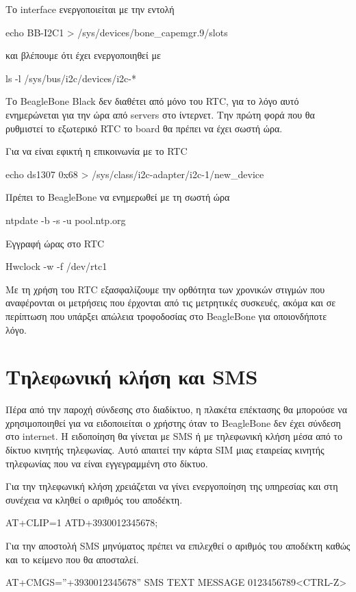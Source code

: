 \documentclass[12pt, a4paper, oneside]{report}
\begin{document}
Το interface ενεργοποιείται με την εντολή
\begin{code}
echo BB-I2C1 > /sys/devices/bone_capemgr.9/slots
\end{code}
και βλέπουμε ότι έχει ενεργοποιηθεί με
\begin{code}
ls -l /sys/bus/i2c/devices/i2c-*
\end{code}

Το BeagleBone Black δεν διαθέτει από μόνο του RTC, για το λόγο αυτό ενημερώνεται για την ώρα από servers στο ίντερνετ. Την πρώτη φορά που θα ρυθμιστεί το εξωτερικό RTC το board θα πρέπει να έχει σωστή ώρα.

Για να είναι εφικτή η επικοινωνία με το RTC
\begin{code}
echo ds1307 0x68 > /sys/class/i2c-adapter/i2c-1/new_device
\end{code}

Πρέπει το BeagleBone να ενημερωθεί με τη σωστή ώρα
\begin{code}
ntpdate -b -s -u pool.ntp.org
\end{code}

Εγγραφή ώρας στο RTC
\begin{code}
Hwclock -w -f /dev/rtc1
\end{code}

Με τη χρήση του RTC εξασφαλίζουμε την ορθότητα των χρονικών στιγμών που αναφέρονται οι μετρήσεις που έρχονται από τις μετρητικές συσκευές, ακόμα και σε περίπτωση που υπάρξει απώλεια τροφοδοσίας στο BeagleBone για οποιονδήποτε λόγο.

\section{Τηλεφωνική κλήση και SMS}

Πέρα από την παροχή σύνδεσης στο διαδίκτυο, η πλακέτα επέκτασης θα μπορούσε να χρησιμοποιηθεί για να ειδοποιείται ο χρήστης όταν το BeagleBone δεν έχει σύνδεση στο internet. Η ειδοποίηση θα γίνεται με SMS ή με τηλεφωνική κλήση μέσα από το δίκτυο κινητής τηλεφωνίας. Αυτό απαιτεί την κάρτα SIM μιας εταιρείας κινητής τηλεφωνίας που να είναι εγγεγραμμένη στο δίκτυο.

Για την τηλεφωνική κλήση χρειάζεται να γίνει ενεργοποίηση της υπηρεσίας και στη συνέχεια να κληθεί ο αριθμός του αποδέκτη.
\begin{code}
AT+CLIP=1
ATD+3930012345678;
\end{code}

Για την αποστολή SMS μηνύματος πρέπει να επιλεχθεί ο αριθμός του αποδέκτη καθώς και το κείμενο που θα αποσταλεί.
\begin{code}
AT+CMGS=''+3930012345678''
SMS TEXT MESSAGE
0123456789<CTRL-Z>
\end{code}
\end{document}
